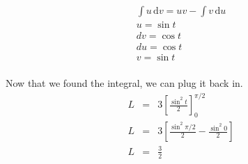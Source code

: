 \documentclass[11pt]{exam}
\begin{document}
\begin{minipage}{.5\linewidth}
	\begin{eqnarray*}
	  	\int u \, \mathrm{d}v = uv - \int v \, \mathrm{d}u\\
	  	u = \sin t\\
	  	dv = \cos t\\
	  	du = \cos t\\
	  	v = \sin t\\
	\end{eqnarray*}
\end{minipage}
Now that we found the integral, we can plug it back in. 
\begin{eqnarray*}
	L &=& 3\left[\frac{\sin^2 t}{2}\right]_0^{\pi/2} \\
	L &=& 3\left[\frac{\sin^2 \pi/2}{2} - \frac{\sin^2 0}{2}\right] \\
	L &=& \frac{3}{2} \\	
\end{eqnarray*}
\end{document}
